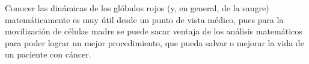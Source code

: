 Conocer las dinámicas de los glóbulos rojos (y, en general, de la sangre) matemáticamente es muy útil desde un punto de vista médico, pues para la movilización de células madre se puede sacar ventaja de los análisis matemáticos para poder lograr un mejor procedimiento, que pueda salvar o mejorar la vida de un paciente con cáncer.
